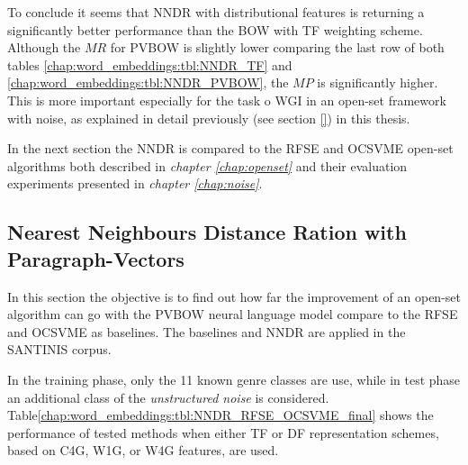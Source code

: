 To conclude it seems that NNDR with distributional features is returning a significantly better performance than the BOW with TF weighting scheme. Although the $ΜR$ for PVBOW is slightly lower comparing the last row of both tables \ref{chap:word_embeddings:tbl:NNDR_TF} and \ref{chap:word_embeddings:tbl:NNDR_PVBOW}, the $MP$ is significantly higher. This is more important especially for the task o WGI in an open-set framework with noise, as explained in detail previously (see section \ref{}) in this thesis. 

In the next section the NNDR is compared to the RFSE and OCSVME open-set algorithms both described in \textit{chapter \ref{chap:openset}} and their evaluation experiments presented in \textit{chapter \ref{chap:noise}}.


\subsection{Nearest Neighbours Distance Ration with Paragraph-Vectors}\label{chap:word_embeddings:sec:experiments_setup}

In this section the objective is to find out  how far the improvement of an open-set algorithm can go with the PVBOW neural language model compare to the RFSE and OCSVME as baselines. The baselines and NNDR are applied in the SANTINIS corpus. 

In the training phase, only the 11 known genre classes are use, while in test phase an additional class of the \textit{unstructured noise} is considered. Table\ref{chap:word_embeddings:tbl:NNDR_RFSE_OCSVME_final} shows the performance of tested methods when either TF or DF representation schemes, based on C4G, W1G, or W4G features, are used. 

